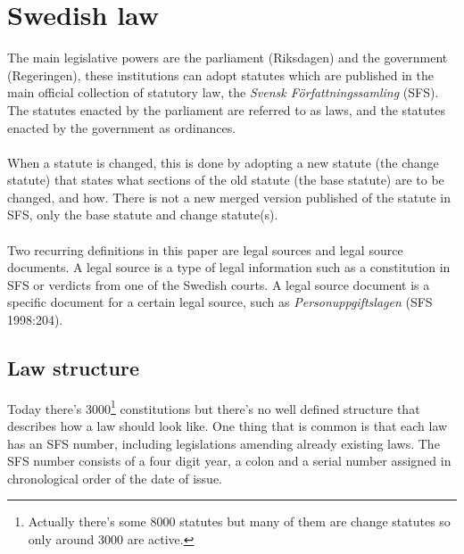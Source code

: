 \section{Swedish law}
The main legislative powers are the parliament (Riksdagen) and the government (Regeringen), these institutions can adopt statutes which are published in the main official collection of statutory law, the \textit{Svensk Författningssamling} (SFS). The statutes enacted by the parliament are referred to as laws, and the statutes enacted by the government as ordinances.\cite{lagrumBib}\\\\
When a statute is changed, this is done by adopting a new statute (the change statute) that states what sections of the old statute (the base statute) are to be changed, and how. There is not a new merged version published of the statute in SFS, only the base statute and change statute(s).\\\\
Two recurring definitions in this paper are legal sources and legal source documents. A legal source is a type of legal information such as a constitution in SFS or verdicts from one of the Swedish courts. A legal source document is a specific document for a certain legal source, such as \textit{Personuppgiftslagen} (SFS 1998:204). 
\subsection{Law structure}
Today there's 3000\footnote{Actually there's some 8000 statutes but many of them are change statutes so only around 3000 are active.} constitutions but there's no well defined structure that describes how a law should look like. One thing that is common is that each law has an SFS number, including legislations amending already existing laws. The SFS number consists of a four digit year, a colon and a serial number assigned in chronological order of the date of issue. 

